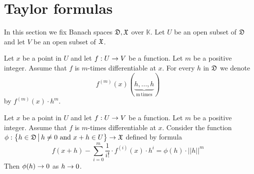 \section{Taylor formulas}
\noindent
In this section we fix Banach spaces ${\mathfrak D},{\mathfrak X}$ over $\mathbb{K}$. Let $U$ be an open subset of ${\mathfrak D}$ and let $V$ be an open subset of ${\mathfrak X}$.

\begin{remark}\label{remark:power_notation_for_higher_order_derivative}
Let $x$ be a point in $U$ and let $f:U\rightarrow V$ be a function. Let $m$ be a positive integer. Assume that $f$ is $m$-times differentiable at $x$. For every $h$ in ${\mathfrak D}$ we denote 
$$f^{(m)}(x)(\underbrace{h,...,h}_{\mathrm{m\,times}})$$
by $f^{(m)}(x)\cdot h^m$. 
\end{remark}

\begin{theorem}\label{theorem:Taylor_formula_with_Peano_remainder}
Let $x$ be a point in $U$ and let $f:U\rightarrow V$ be a function. Let $m$ be a positive integer. Assume that $f$ is $m$-times differentiable at $x$. Consider the function $\phi:\big\{h\in {\mathfrak D}\,\big|\,h\neq 0\mbox{ and }x+h\in U\big\} \rightarrow {\mathfrak X}$ defined by formula 
$$f(x + h) - \sum_{i=0}^m\frac{1}{i!}\cdot f^{(i)}(x)\cdot h^i = \phi(h)\cdot ||h||^m$$
Then $\phi(h)\rightarrow 0$ as $h\rightarrow 0$.
\end{theorem}
